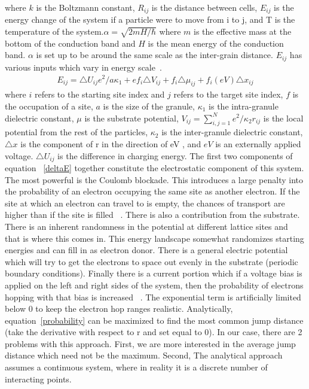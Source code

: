 where $k$ is the Boltzmann constant, $R_{ij}$ is the distance between cells, $E_{ij}$ is the energy change of the system if a particle were to move from i to j, and T is the temperature of the system.$\alpha = \sqrt{2mH/\hbar}$ where $m$ is the effective mass at the bottom of the conduction band and $H$ is the mean energy of the conduction band. $\alpha$ is set up to be around the same scale as the inter-grain distance. $E_{ij}$ has various inputs which vary in energy scale~\cite{Mott68}.
\begin{eqnarray}
E_{ij} =  \triangle U_{ij} e^2/a\kappa_1  + e f_i \triangle V_{ij} + f_i  \triangle \mu_{ij} + f_i (eV) \triangle x_{ij} 
\label{deltaE}
\end{eqnarray}
where $i$ refers to the starting site index and $j$ refers to the target site index,  $f$ is the occupation of a site, $a$ is the size of the granule, $\kappa_1$ is the intra-granule dielectric constant, $\mu$ is the substrate potential, $V_{ij} = \sum_{i,j=1}^{N} e^2/\kappa_2 r_{ij}$ is the local potential from the rest of the particles, $\kappa_2$ is the inter-granule dielectric constant, $\triangle x$ is the component of r in the direction of eV , and $eV$ is an externally applied voltage. $\triangle U_{ij}$ is the difference in charging energy. The first two components of equation ~\ref{deltaE} together constitute the electrostatic component of this system. The most powerful is the Coulomb blockade. This introduces a large penalty into the probability of an electron occupying the same site as another electron. If the site at which an electron can travel to is empty, the chances of transport are higher than if the site is filled ~\cite{glazman05}. There is also a contribution from the substrate. There is an inherent randomness in the potential at different lattice sites and that is where this comes in. This energy landscape somewhat randomizes starting energies and can fill in as electron donor. There is a general electric potential which will try to get the electrons to space out evenly in the substrate (periodic boundary conditions). Finally there is a current portion which if a voltage bias is applied on the left and right sides of the system, then the probability of electrons hopping with that bias is increased ~\cite{aharony92}. The exponential term is artificially limited below 0 to keep the electron hop ranges realistic. Analytically, equation~\ref{probability} can be maximized to find the most common jump distance (take the derivative with respect to r and set equal to 0). In our case, there are 2 problems with this approach. First, we are more interested in the average jump distance which need not be the maximum. Second, The analytical approach assumes a continuous system, where in reality it is a discrete number of interacting points.

